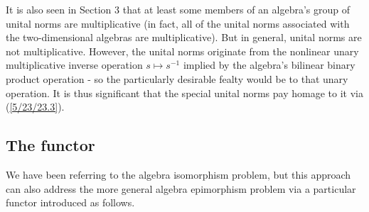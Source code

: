 \documentclass{amsart}
\numberwithin{equation}{section}
\theoremstyle{definition}
\numberwithin{theorem}{section}
\begin{document}
It is also seen in Section 3 that at least some members of an algebra's group of unital norms are multiplicative (in fact, all of the unital norms associated with the two-dimensional algebras are multiplicative).   But in general, unital norms are not multiplicative.  However, the unital norms originate from the nonlinear unary multiplicative inverse operation $s\mapsto s^{-1}$ implied by the algebra's bilinear binary product operation - so the particularly desirable fealty would be to that unary operation.  It is thus significant that the special unital norms pay homage to it via (\ref{5/23/23.3}). 

\subsection{The functor}

We have been referring to the algebra isomorphism problem, but this approach can also address the more general algebra epimorphism problem via a particular functor introduced as follows.  
\end{document}
